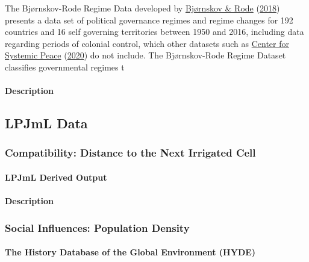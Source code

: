 \documentclass[12pt,twoside]{reedthesis}
\begin{document}
The Bjørnskov-Rode Regime Data developed by \protect\hyperlink{ref-bjornskovRegimeTypesRegime2018}{Bjørnskov \& Rode} (\protect\hyperlink{ref-bjornskovRegimeTypesRegime2018}{2018}) presents a data set of political governance regimes and regime changes for 192 countries and 16 self governing territories between 1950 and 2016, including data regarding periods of colonial control, which other datasets such as \protect\hyperlink{ref-centerforsystemicpeacePolityProjectPolity2020}{Center for Systemic Peace} (\protect\hyperlink{ref-centerforsystemicpeacePolityProjectPolity2020}{2020}) do not include. The Bjørnskov-Rode Regime Dataset classifies governmental regimes t

\hypertarget{description-1}{%
\paragraph{Description}\label{description-1}}

\hypertarget{lpjml-data}{%
\subsection{LPJmL Data}\label{lpjml-data}}

\hypertarget{dist}{%
\subsubsection{Compatibility: Distance to the Next Irrigated Cell}\label{dist}}

\hypertarget{lpjml-derived-output}{%
\paragraph{LPJmL Derived Output}\label{lpjml-derived-output}}

\hypertarget{description-2}{%
\paragraph{Description}\label{description-2}}

\hypertarget{social-influences-population-density}{%
\subsubsection{Social Influences: Population Density}\label{social-influences-population-density}}

\hypertarget{the-history-database-of-the-global-environment-hyde}{%
\paragraph{The History Database of the Global Environment (HYDE)}\label{the-history-database-of-the-global-environment-hyde}}
\end{document}
